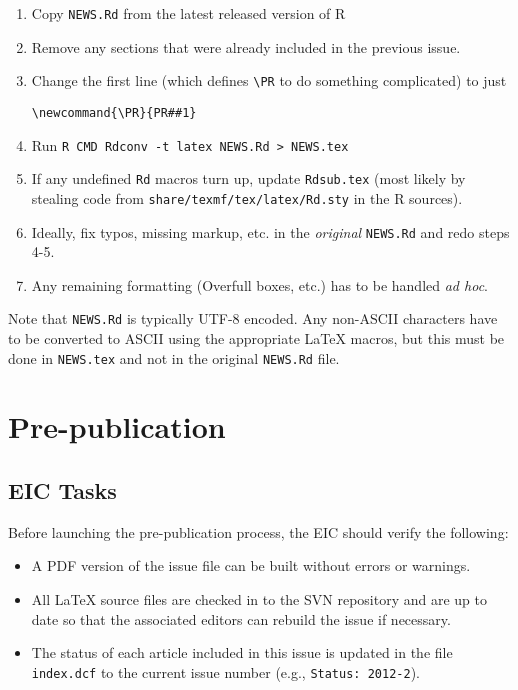 \documentclass[11pt]{article}
\begin{document}
\begin{enumerate}
\item Copy \texttt{NEWS.Rd} from the latest released version of R
\item Remove any sections that were already included in the previous issue.
\item Change the first line (which defines \verb+\PR+ to do something
complicated) to just 
\begin{verbatim}
\newcommand{\PR}{PR##1}
\end{verbatim}
\item Run \verb+R CMD Rdconv -t latex NEWS.Rd > NEWS.tex+
\item If any undefined \verb+Rd+ macros turn up, update
  \texttt{Rdsub.tex} (most likely by stealing code from
  \texttt{share/texmf/tex/latex/Rd.sty} in the R sources).
\item Ideally, fix typos, missing markup, etc. in the {\em original}
\texttt{NEWS.Rd} and redo steps 4-5.
\item Any remaining formatting (Overfull boxes, etc.) has to be
  handled {\em ad hoc}.
\end{enumerate}
Note that \texttt{NEWS.Rd} is typically UTF-8 encoded.  Any non-ASCII
characters have to be converted to ASCII using the appropriate LaTeX
macros, but this must be done in \texttt{NEWS.tex} and not in the
original \texttt{NEWS.Rd} file.

\section{Pre-publication}

\subsection{EIC Tasks}

Before launching the pre-publication process, the EIC should verify
the following:
\begin{itemize}
\item A PDF version of the issue file can be built without errors or
  warnings.
\item All LaTeX source files are checked in to the SVN repository and
  are up to date so that the associated editors can rebuild the issue
  if necessary.
\item The status of each article included in this issue is updated in
  the file \texttt{index.dcf} to the current issue number (e.g.,
  \verb+Status: 2012-2+).
\end{itemize}
\end{document}
